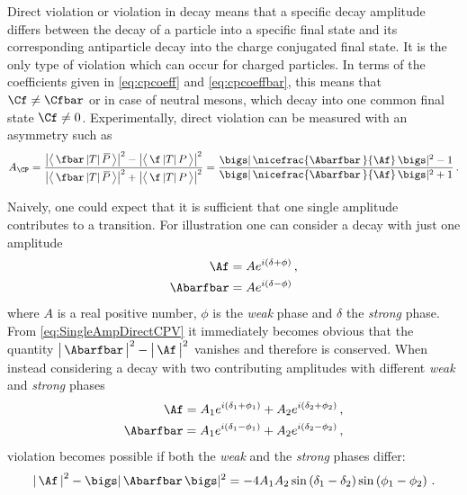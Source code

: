 Direct \CP violation or \CP violation in decay means that a specific decay amplitude differs between the decay of a particle into a specific final state and its corresponding antiparticle decay into the charge conjugated final state.
It is the only type of \CP violation which can occur for charged particles.
In terms of the \CP coefficients given in \cref{eq:cpcoeff} and \cref{eq:cpcoeffbar}, this means that $\Cf\neq\Cfbar$ or in case of neutral mesons, which decay into one common final state $\Cf\neq0$.
Experimentally, direct \CP violation can be measured with an asymmetry such as
\begin{equation}
A_{\CP}=\frac{\big|\big<\,\fbar\,|T|\,\kern 0.18em\overline{\kern -0.18em P}\,\big>\big|^2-\big|\big<\,\f\,|T|\,P\,\big>\big|^2}{\big|\big<\,\fbar\,|T|\,\kern 0.18em\overline{\kern -0.18em P}\,\big>\big|^2+\big|\big<\,\f\,|T|\,P\,\big>\big|^2} = \frac{\bigs|\,\nicefrac{\Abarfbar\,}{\Af}\,\bigs|^2-1}{\bigs|\,\nicefrac{\Abarfbar\,}{\Af}\,\bigs|^2+1}\,.
\end{equation}

Naively, one could expect that it is sufficient that one single amplitude contributes to a transition.
For illustration one can consider a decay with just one amplitude
\begin{equation}
\begin{split}
\Af&=Ae^{i\left(\delta+\phi\right)}\,,\\
\Abarfbar&=Ae^{i\left(\delta-\phi\right)}\label{eq:SingleAmpDirectCPV}
\end{split}
\end{equation}
where $A$ is a real positive number, $\phi$ is the \emph{weak} phase and $\delta$ the \emph{strong} phase.
From \cref{eq:SingleAmpDirectCPV} it immediately becomes obvious that the quantity $\big|\,\Abarfbar\,\big|^2-\big|\,\Af\,\big|^2$ vanishes and therefore \CP is conserved.
When instead considering a decay with two contributing amplitudes with different \emph{weak} and \emph{strong} phases
\begin{equation}
\begin{split}
\Af=A_1e^{i\left(\delta_1+\phi_1\right)}+A_2e^{i\left(\delta_2+\phi_2\right)}\,,\\
\Abarfbar=A_1e^{i\left(\delta_1-\phi_1\right)}+A_2e^{i\left(\delta_2-\phi_2\right)}\,,
\end{split}
\end{equation}
\CP violation becomes possible if both the \emph{weak} and the \emph{strong} phases differ:
\begin{equation}
\left|\,\Af\,\right|^2-\bigs|\,\Abarfbar\,\bigs|^2=-4A_1A_2\sin\left(\delta_1-\delta_2\right)\sin\left(\phi_1-\phi_2\right)\,.
\end{equation}

